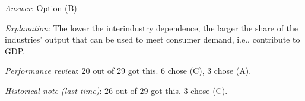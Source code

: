 \documentclass[10pt]{amsart}
\begin{document}
\begin{enumerate}
  {\em Answer}: Option (B)

  {\em Explanation}: The lower the interindustry dependence, the
  larger the share of the industries' output that can be used to meet
  consumer demand, i.e., contribute to GDP.

  {\em Performance review}: 20 out of 29 got this. 6 chose (C), 3
  chose (A).

  {\em Historical note (last time)}: $26$ out of $29$ got this. $3$ chose (C).
\end{enumerate}
\end{document}
